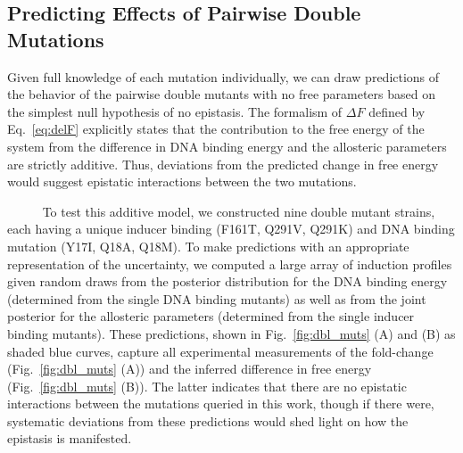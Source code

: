 \documentclass[12pt]{caltech_thesis}
\begin{document}
\hypertarget{predicting-effects-of-pairwise-double-mutations}{%
\subsection{Predicting Effects of Pairwise Double
Mutations}\label{predicting-effects-of-pairwise-double-mutations}}

Given full knowledge of each mutation individually, we can draw
predictions of the behavior of the pairwise double mutants with no free
parameters based on the simplest null hypothesis of no epistasis. The
formalism of \(\Delta F\) defined by Eq.~\ref{eq:delF} explicitly states
that the contribution to the free energy of the system from the
difference in DNA binding energy and the allosteric parameters are
strictly additive. Thus, deviations from the predicted change in free
energy would suggest epistatic interactions between the two mutations.

~~~~~ To test this additive model, we constructed nine double mutant
strains, each having a unique inducer binding (F161T, Q291V, Q291K) and
DNA binding mutation (Y17I, Q18A, Q18M). To make predictions with an
appropriate representation of the uncertainty, we computed a large array
of induction profiles given random draws from the posterior distribution
for the DNA binding energy (determined from the single DNA binding
mutants) as well as from the joint posterior for the allosteric
parameters (determined from the single inducer binding mutants). These
predictions, shown in Fig.~\ref{fig:dbl_muts} (A) and (B) as shaded blue
curves, capture all experimental measurements of the fold-change
(Fig.~\ref{fig:dbl_muts} (A)) and the inferred difference in free energy
(Fig.~\ref{fig:dbl_muts} (B)). The latter indicates that there are no
epistatic interactions between the mutations queried in this work,
though if there were, systematic deviations from these predictions would
shed light on how the epistasis is manifested.
\end{document}
